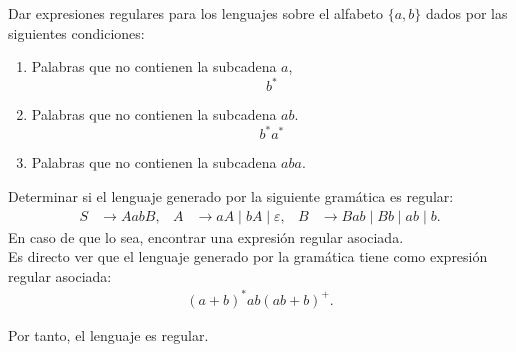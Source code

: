 \begin{ejercicio} \label{ej:1.2.12}
    Dar expresiones regulares para los lenguajes sobre el alfabeto $\{a, b\}$ dados por las siguientes condiciones:
    \begin{enumerate}
        \item Palabras que no contienen la subcadena $a$,
        \begin{equation*}
            b^*
        \end{equation*}
        \item Palabras que no contienen la subcadena $ab$.
        \begin{equation*}
            b^*a^*
        \end{equation*}
        \item Palabras que no contienen la subcadena $aba$.
        
    \end{enumerate}
\end{ejercicio}

\begin{ejercicio}
    Determinar si el lenguaje generado por la siguiente gramática es regular:
    \begin{align*}
        S &\to AabB, & A &\to aA \mid bA \mid \varepsilon, & B &\to Bab \mid Bb \mid ab \mid b.
    \end{align*}
    En caso de que lo sea, encontrar una expresión regular asociada.\\

    Es directo ver que el lenguaje generado por la gramática tiene como expresión regular asociada:
    \begin{align*}
        (a+b)^*ab(ab+b)^+.
    \end{align*}

    Por tanto, el lenguaje es regular.
\end{ejercicio}


